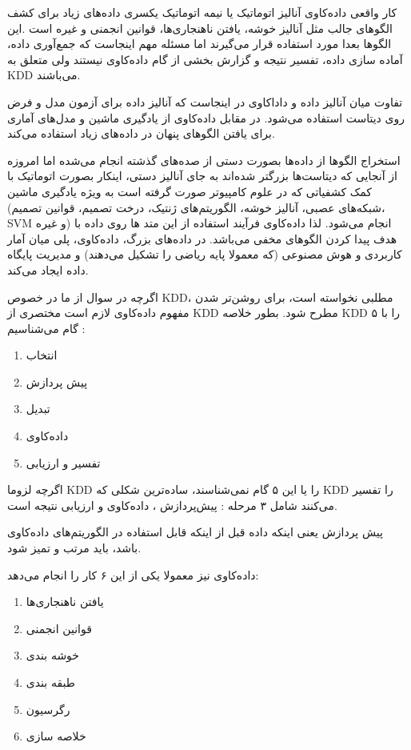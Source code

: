 \documentclass[a4paper, 12pt]{article}
\begin{document}
کار واقعی داده‌کاوی آنالیز اتوماتیک یا نیمه اتوماتیک یکسری داده‌های زیاد برای کشف الگوهای جالب  مثل آنالیز خوشه، یافتن ناهنجاری‌ها، قوانین انجمنی و غیره است .این الگو‌ها بعدا مورد استفاده قرار می‌گیرند اما مسئله مهم اینجاست که جمع‌آوری داده، آماده سازی داده، تفسیر نتیجه و گزارش بخشی از گام داده‌کاوی نیستند ولی متعلق به KDD می‌باشند. 

تفاوت میان آنالیز داده و دادا‌کاوی در اینجاست که آنالیز داده برای آزمون مدل و فرض روی دیتاست استفاده می‌شود. در مقابل داده‌کاوی از یادگیری ماشین و مدل‌های آماری برای یافتن الگو‌های پنهان در داده‌های زیاد استفاده می‌کند.

استخراج الگوها از داده‌ها بصورت دستی از صده‌های گذشته انجام می‌شده اما امروزه از آنجایی که دیتاست‌ها بزرگتر شده‌اند به جای آنالیز دستی، اینکار بصورت اتوماتیک با کمک کشفیاتی که در علوم کامپیوتر صورت گرفته است به ویژه یادگیری ماشین (شبکه‌های عصبی، آنالیز خوشه، الگوریتم‌های ژنتیک، درخت تصمیم، قوانین تصمیم، SVM و غیره) انجام می‌شود. لذا داده‌کاوی فرآیند استفاده از این متد ها روی داده با هدف پیدا کردن الگو‌های مخفی می‌باشد. در داده‌های بزرگ، داده‌کاوی، پلی میان آمار کاربردی و هوش مصنوعی (که معمولا پایه ریاضی را تشکیل می‌دهند) و مدیریت پایگاه داده ایجاد می‌کند. 

اگرچه در سوال از ما در خصوص KDD، مطلبی نخواسته است، برای روشن‌تر شدن مفهوم داده‌کاوی لازم‌ است مختصری از KDD مطرح شود. بطور خلاصه KDD را با ۵ گام می‌شناسیم :
\begin{enumerate}
	\item
	 انتخاب 
	\item
	پیش پردازش
	\item
	تبدیل
	\item
	داده‌کاوی
	\item
	تفسیر و ارزیابی
\end{enumerate} 
 اگرچه لزوما KDD را یا این ۵ گام نمی‌شناسند، ساده‌ترین شکلی که KDD را تفسیر می‌کنند شامل ۳ مرحله : پیش‌پردازش ، داده‌کاوی و ارزیابی نتیجه است.
 
 پیش پردازش یعنی اینکه داده قبل از اینکه قابل استفاده در الگوریتم‌های داده‌کاوی باشد، باید مرتب و تمیز شود.
 
 داده‌کاوی نیز معمولا یکی از این ۶ کار را انجام می‌دهد:
 \begin{enumerate}
 	\item
 	یافتن ناهنجاری‌ها 
 	\item
 	قوانین انجمنی
 	\item
 	خوشه بندی
 	\item
 	طبقه بندی
 	\item
 	رگرسیون
 	\item
 	خلاصه سازی
 \end{enumerate}
 
\end{document}
